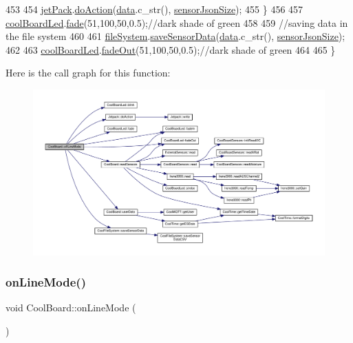 \begin{DoxyCode}
453     
454         \hyperlink{classCoolBoard_a30b1357881b01ccbec676856a91e48e9}{jetPack}.\hyperlink{classJetpack_a86d2e83436ef4b85f4c3a6e85ac785b0}{doAction}(\hyperlink{classCoolBoard_a427fb753dd8575bdf821c70a5c63d695}{data}.c\_str(), \hyperlink{classCoolBoard_a58e4b6072e3ac8b141ec0befb479208e}{sensorJsonSize});
455     \}
456     
457     \hyperlink{classCoolBoard_a1b1d3c684a5baa56b08486e192fd8e97}{coolBoardLed}.\hyperlink{classCoolBoardLed_af1cacbaa88db8bcf6042c1083ba41155}{fade}(51,100,50,0.5);\textcolor{comment}{//dark shade of green  }
458     
459     \textcolor{comment}{//saving data in the file system}
460     
461     \hyperlink{classCoolBoard_a42c2586fbb13ff7f06538e9284e8538d}{fileSystem}.\hyperlink{classCoolFileSystem_a4c560c2ddd40b74b7758e6ceb2c58957}{saveSensorData}(\hyperlink{classCoolBoard_a427fb753dd8575bdf821c70a5c63d695}{data}.c\_str(), 
      \hyperlink{classCoolBoard_a58e4b6072e3ac8b141ec0befb479208e}{sensorJsonSize});
462 
463     \hyperlink{classCoolBoard_a1b1d3c684a5baa56b08486e192fd8e97}{coolBoardLed}.\hyperlink{classCoolBoardLed_a93d545679237e8cc858324367149775c}{fadeOut}(51,100,50,0.5);\textcolor{comment}{//dark shade of green    }
464 
465 \}
\end{DoxyCode}
Here is the call graph for this function\+:
\nopagebreak
\begin{figure}[H]
\begin{center}
\leavevmode
\includegraphics[width=350pt]{classCoolBoard_ae6b5e1274d760462290192acea4adca8_cgraph}
\end{center}
\end{figure}
\mbox{\label{classCoolBoard_aa0bbc4bc605e35618d18e68795c61363}} 
\subsubsection{\texorpdfstring{on\+Line\+Mode()}{onLineMode()}}
{\footnotesize\ttfamily void Cool\+Board\+::on\+Line\+Mode (\begin{DoxyParamCaption}{ }\end{DoxyParamCaption})}

